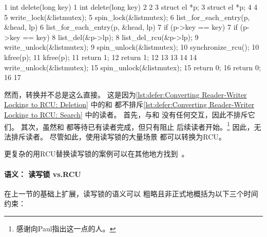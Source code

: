 \begin{listing*}
{ \scriptsize
\begin{verbbox}
 1 int delete(long key)                  1 int delete(long key)
 2 {                                     2 {
 3   struct el *p;                       3   struct el *p;
 4                                       4
 5   write_lock(&listmutex);             5   spin_lock(&listmutex);
 6   list_for_each_entry(p, &head, lp) { 6   list_for_each_entry(p, &head, lp) {
 7     if (p->key == key) {              7     if (p->key == key) {
 8       list_del(&p->lp);               8       list_del_rcu(&p->lp);
 9       write_unlock(&listmutex);       9       spin_unlock(&listmutex);
                                        10       synchronize_rcu();
10       kfree(p);                      11       kfree(p);
11       return 1;                      12       return 1;
12     }                                13     }
13   }                                  14   }
14   write_unlock(&listmutex);          15   spin_unlock(&listmutex);
15   return 0;                          16   return 0;
16 }                                    17 }
\end{verbbox}
}
\hspace*{0.9in}\OneColumnHSpace{-0.5in}
\IfEbookSize{\hspace*{-1.05in}}{}\theverbbox
\caption{将读写锁转换为RCU：
						    删除}
\label{lst:defer:Converting Reader-Writer Locking to RCU: Deletion}
\end{listing*}

然而，转换并不总是这么直接。
这是因为\cref{lst:defer:Converting Reader-Writer Locking to RCU: Deletion}
中的和
都不排斥\cref{lst:defer:Converting Reader-Writer Locking to RCU: Search}
中的读者。
首先，与和
没有任何交互，因此不排斥它们。
其次，虽然和
都等待已有读者完成，但只有阻止
后续读者开始。\footnote{
	感谢向Paul指出这一点的人。}
因此，无法排斥读者。
尽管如此，使用读写锁的大量场景
都可以转换为RCU。

更复杂的用RCU替换读写锁的案例可以在其他地方找到~\cite{NeilBrown2015PathnameLookup,NeilBrown2015RCUwalk}。

\paragraph{语义：
		      读写锁 vs.\@ RCU}

在上一节的基础上扩展，读写锁的语义可以
粗略且非正式地概括为以下三个时间约束：

